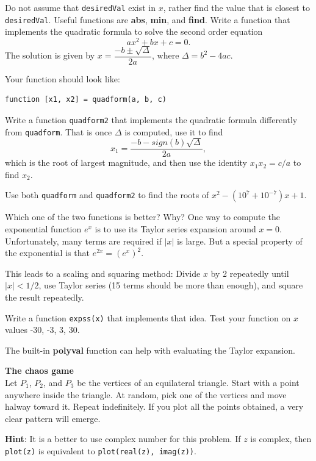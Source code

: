 \documentclass[12pt]{TDTP}
\begin{document}
Do not assume that \texttt{desiredVal} exist in $x$, rather find the value that is closest to \texttt{desiredVal}.
Useful functions are \textbf{abs}, \textbf{min}, and \textbf{find}.
\Exo
Write a function that implements the quadratic formula to solve the second order equation
$$
ax^2 + bx + c = 0.
$$
The solution is given by $x = \dfrac{-b \pm \sqrt{\Delta}}{2a}$, where $\Delta = b^2 - 4ac$.

Your function should look like:
\begin{verbatim}
function [x1, x2] = quadform(a, b, c)
\end{verbatim}

\bigskip
Write a function \texttt{quadform2} that implements the quadratic formula differently from \texttt{quadform}. That is once $\Delta$ is computed, use it to find
$$
x_1 = \dfrac{-b -sign(b)\sqrt{\Delta}}{2a},
$$
which is the root of largest magnitude, and then use the identity $x_1 x_2 = c/a$ to find $x_2$.

\bigskip
Use both \texttt{quadform} and \texttt{quadform2} to find the roots of $x^2 -(10^7+10^{-7})x +1$.

Which one of the two functions is better? Why?
\Exo
One way to compute the exponential function $e^x$ is to use its Taylor series expansion around $x=0$.
Unfortunately, many terms are required if $|x|$ is large.
But a special property of the exponential is that $e^{2x}=(e^x)^2$.

This leads to a scaling and squaring method: Divide $x$ by 2 repeatedly until $|x| < 1/2$, use Taylor series (15 terms should be more than enough), and square the result repeatedly.

Write a function \texttt{expss(x)} that implements that idea.
Test your function on $x$ values -30, -3, 3, 30.

The built-in \textbf{polyval} function can help with evaluating the Taylor expansion.

\Exo
\textbf{The chaos game}\\
Let $P_1$, $P_2$, and $P_3$ be the vertices of an equilateral triangle.
Start with a point anywhere inside the triangle.
At random, pick one of the vertices and move halway toward it. Repeat indefinitely.
If you plot all the points obtained, a very clear pattern will emerge.

\textbf{Hint}: It is a better to use complex number for this problem. If $z$ is complex, then \texttt{plot(z)} is equivalent to \texttt{plot(real(z), imag(z))}.
\end{document}
